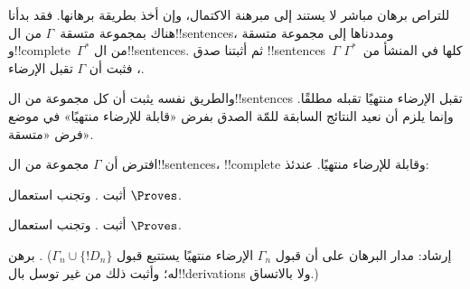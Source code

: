 \documentclass[../../../include/open-logic-section]{subfiles}
\begin{document}
      {}
      {}


للتراص برهان مباشر لا يستند إلى مبرهنة الاكتمال، وإن أخذ بطريقة
برهانها. فقد بدأنا هناك بمجموعة متسقة~$\Gamma$ من ال!!{sentence}s،
ومددناها إلى مجموعة متسقة
و!!{complete}~$\Gamma^*$ من ال!!{sentence}s. ثم أثبتنا صدق
!!{sentence}s~$\Gamma$ كلها في
المنشأ من~$\Gamma^*$، فثبت أن $\Gamma$ تقبل الإرضاء.

والطريق نفسه يثبت أن كل مجموعة من ال!!{sentence}s تقبل الإرضاء
منتهيًا تقبله مطلقًا. وإنما يلزم أن نعيد النتائج السابقة للمّة الصدق
بفرض «قابلة للإرضاء منتهيًا» في موضع فرض «متسقة».

\begin{prop}
افترض أن $\Gamma$ مجموعة من ال!!{sentence}s، !!{complete} وقابلة للإرضاء
منتهيًا. عندئذ:
\begin{enumerate}


\end{enumerate}
\end{prop}

\begin{prob}
أثبت . وتجنب استعمال $\Proves$.
\end{prob}
\tagendprob

\begin{prob}
أثبت . وتجنب استعمال $\Proves$.
\end{prob}
\tagendprob


\begin{prob}
برهن . (إرشاد: مدار البرهان
على أن قبول $\Gamma_n$ الإرضاء منتهيًا يستتبع قبول
$\Gamma_n \cup \{!D_n\}$ له؛ وأثبت ذلك من غير توسل بال!!{derivation}s
ولا بالاتساق.)
\end{prob}
\tagendprob
\end{document}
